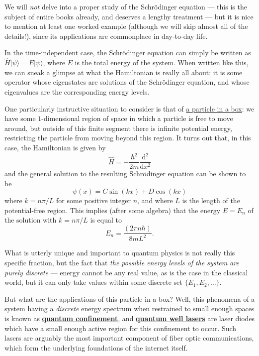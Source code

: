 \documentclass[fleqn]{article}
\newenvironment{technical}{\noindent}{\medskip}
\begin{document}
\begin{technical}
We will \emph{not} delve into a proper study of the Schrödinger equation --- this is the subject of entire books already, and deserves a lengthy treatment --- but it is nice to mention at least one worked example (although we will skip almost all of the details!), since its applications are commonplace in day-to-day life.

In the time-independent case, the Schrödinger equation can simply be written as \(\hat{H}|\psi\rangle=E|\psi\rangle\), where \(E\) is the total energy of the system.
When written like this, we can sneak a glimpse at what the Hamiltonian is really all about: it is some operator whose eigenstates are solutions of the Schrödinger equation, and whose eigenvalues are the corresponding energy levels.

One particularly instructive situation to consider is that of \href{https://en.wikipedia.org/wiki/Particle_in_a_box}{a particle in a box}: we have some \(1\)-dimensional region of space in which a particle is free to move around, but outside of this finite segment there is infinite potential energy, restricting the particle from moving beyond this region.
It turns out that, in this case, the Hamiltonian is given by
\[
  \hat{H} = -\frac{\hbar^2}{2m}\frac{\mathrm{d}^2}{\mathrm{d}x^2}
\]
and the general solution to the resulting Schrödinger equation can be shown to be
\[
  \psi(x) = C\sin(kx)+D\cos(kx)
\]
where \(k=n\pi/L\) for some positive integer \(n\), and where \(L\) is the length of the potential-free region.
This implies (after some algebra) that the energy \(E=E_n\) of the solution with \(k=n\pi/L\) is equal to
\[
  E_n = \frac{(2\pi n\hbar)}{8mL^2}.
\]

What is utterly unique and important to quantum physics is not really this specific fraction, but the fact that \emph{the possible energy levels of the system are purely discrete} --- energy cannot be any real value, as is the case in the classical world, but it can only take values within some discrete set \(\{E_1,E_2,\ldots\}\).

But what are the applications of this particle in a box?
Well, this phenomena of a system having a \emph{discrete} energy spectrum when restrained to small enough spaces is known as \href{https://en.wikipedia.org/wiki/Quantum_confinement}{\textbf{quantum confinement}}, and \href{https://en.wikipedia.org/wiki/Quantum_well_laser}{\textbf{quantum well lasers}} are laser diodes which have a small enough active region for this confinement to occur.
Such lasers are arguably the most important component of fiber optic communications, which form the underlying foundations of the internet itself.

\end{technical}
\end{document}

